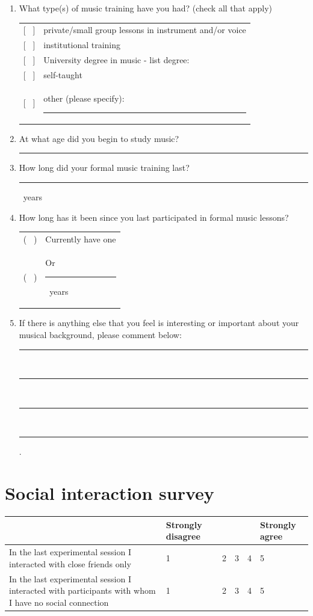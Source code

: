 \documentclass[a4paper,11pt]{article}
\newcommand{\myunderline}{\rule{2in}{.5pt}}
\begin{document}
{\begin{appendices}
\begin{enumerate}[resume]
	\item What type(s) of music training have you had? (check all that apply)

	\begin{tabular}{l l}
		{[{ \ }]} & private/small group lessons in instrument and/or voice \\
		{[{ \ }]} & institutional training \\
		{[{ \ }]} & University degree in music - list degree: \\
		{[{ \ }]} & self-taught \\
		{[{ \ }]} & other (please specify): \myunderline \\
	\end{tabular}

 	\item At what age did you begin to study music?

 	\myunderline

 	\item How long did your formal music training last?

 	\myunderline \ years
 	\item How long has it been since you last participated in formal music lessons?

	\begin{tabular}{l l}
		( \ ) & Currently have one \\
		( \ ) & Or \myunderline \ years \\
	\end{tabular}

	\item \label{appendix:music:after_break}If there is anything else that you feel is interesting or important about your musical background, please comment below:

	\rule{4.5in}{.5pt} \\
	\rule{4.5in}{.5pt} \\
	\rule{4.5in}{.5pt} \\
	\rule{4.5in}{.5pt}.

\end{enumerate}

\section{Social interaction survey}

\begin{tabularx}{\textwidth}{p{2in} | Y Y Y Y Y }
	& Strongly disagree & & & & Strongly agree \\
	\hline
	In the last experimental session I interacted with close friends only & 1 & 2 & 3 & 4 & 5 \\
	\hline
	In the last experimental session I interacted with participants with whom I have no social connection & 1 & 2 & 3 & 4 & 5 \\
\end{tabularx}


\end{appendices}}
\end{document}
